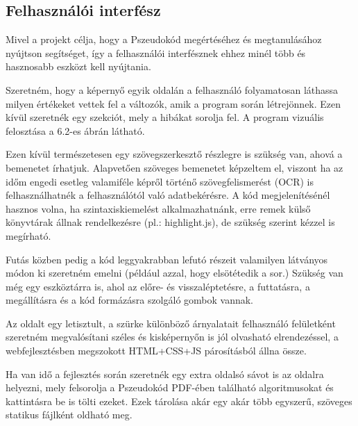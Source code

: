 \subsection{Felhasználói interfész}

Mivel a projekt célja, hogy a Pszeudokód megértéséhez és megtanulásához nyújtson segítséget, így a felhasználói interfésznek ehhez minél több és hasznosabb eszközt kell nyújtania.

Szeretném, hogy a képernyő egyik oldalán a felhasználó folyamatosan láthassa milyen értékeket vettek fel a változók, amik a program során létrejönnek. Ezen kívül szeretnék egy szekciót, mely a hibákat sorolja fel. A program vizuális felosztása a 6.2-es ábrán látható.


Ezen kívül természetesen egy szövegszerkesztő részlegre is szükség van, ahová a bemenetet írhatjuk. Alapvetően szöveges bemenetet képzeltem el, viszont ha az időm engedi esetleg valamiféle képről történő szövegfelismerést (OCR) is felhasználhatnék a felhasználótól való adatbekérésre. A kód megjelenítésénél hasznos volna, ha szintaxiskiemelést alkalmazhatnánk, erre remek külső könyvtárak állnak rendelkezésre (pl.: highlight.js), de szükség szerint kézzel is megírható.

Futás közben pedig a kód leggyakrabban lefutó részeit valamilyen látványos módon ki szeretném emelni (például azzal, hogy elsötétedik a sor.) Szükség van még egy eszköztárra is, ahol az előre- és visszaléptetésre, a futtatásra, a megállításra és a kód formázásra szolgáló gombok vannak.

Az oldalt egy letisztult, a szürke különböző árnyalatait felhasználó felületként szeretném megvalósítani széles és kisképernyőn is jól olvasható elrendezéssel, a webfejlesztésben megszokott HTML+CSS+JS párosításból állna össze.

Ha van idő a fejlesztés során szeretnék egy extra oldalsó sávot is az oldalra helyezni, mely felsorolja a Pszeudokód PDF-ében található algoritmusokat és kattintásra be is tölti ezeket. Ezek tárolása akár egy akár több egyszerű, szöveges statikus fájlként oldható meg.